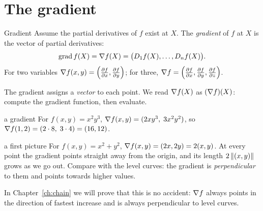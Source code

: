\section{The gradient}

\begin{definition}{Gradient}
Assume the partial derivatives of $f$ exist at $X$. The \emph{gradient} of $f$ at $X$ is
the vector of partial derivatives:
\[
\operatorname{grad} f(X)=\nabla f(X)=\big(D_1f(X),\dots,D_nf(X)\big).
\]
For two variables $\nabla f(x,y)=\left(\frac{\partial f}{\partial x},\frac{\partial f}{\partial y}\right)$; for three,
$\nabla f=\left(\frac{\partial f}{\partial x},\frac{\partial f}{\partial y},\frac{\partial f}{\partial z}\right)$.
\end{definition}

The gradient assigns a \emph{vector} to each point. We read $\nabla f(X)$ as
$(\nabla f)(X)$: compute the gradient function, then evaluate.

\begin{example}{a gradient}
For $f(x,y)=x^2y^3$, $\nabla f(x,y)=(2xy^3,\;3x^2y^2)$, so
$\nabla f(1,2)=(2\cdot8,\;3\cdot4)=(16,12)$.
\end{example}

\begin{example}{a first picture}
For $f(x,y)=x^2+y^2$, $\nabla f(x,y)=(2x,2y)=2(x,y)$. At every point the gradient points
straight away from the origin, and its length $2\left\lVert (x,y)\right\rVert$ grows as we go out.
Compare with the level curves: the gradient is \emph{perpendicular} to them and
points towards higher values.
\end{example}

\begin{center}
\end{center}

In Chapter~\ref{ch:chain} we will prove that this is no accident: $\nabla f$ always points
in the direction of fastest increase and is always perpendicular to level curves.

